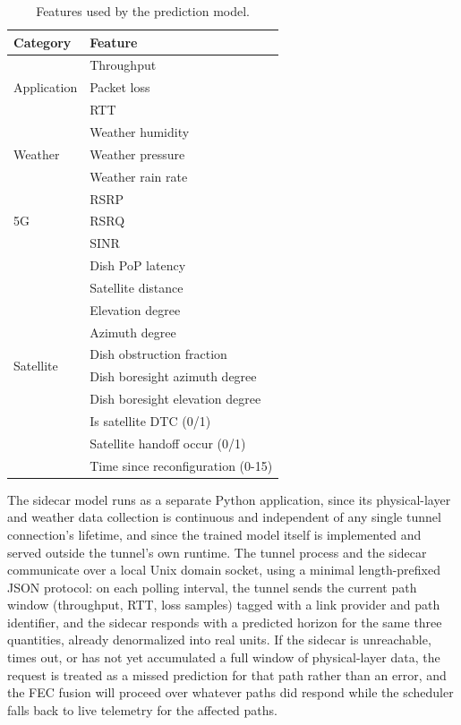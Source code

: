 \documentclass[sigconf,nonacm]{acmart}
\begin{document}
\begin{table}[!htbp]
    \centering
    \caption{Features used by the prediction model.}
    \label{tab:model_features}
    \begin{tabular}{|l||l|}
        \hline
        \textbf{Category} & \textbf{Feature} \\
        \hline
        \hline
        \multirow{3}{*}{Application}
            & Throughput \\
            & Packet loss \\
            & RTT \\
        \hline
        \multirow{3}{*}{Weather}
            & Weather humidity \\
            & Weather pressure \\
            & Weather rain rate \\
        \hline
        \multirow{3}{*}{5G}
            & RSRP \\
            & RSRQ \\
            & SINR \\
        \hline
        \multirow{10}{*}{Satellite}
            & Dish PoP latency \\
            & Satellite distance \\
            & Elevation degree \\
            & Azimuth degree \\
            & Dish obstruction fraction \\
            & Dish boresight azimuth degree \\
            & Dish boresight elevation degree \\
            & Is satellite DTC (0/1) \\
            & Satellite handoff occur (0/1) \\
            & Time since reconfiguration (0-15) \\
        \hline
    \end{tabular}
\end{table}

The sidecar model runs as a separate Python application, since its physical-layer and weather data collection is continuous and independent of any single tunnel connection's lifetime, and since the trained model itself is implemented and served outside the tunnel's own runtime. The tunnel process and the sidecar communicate over a local Unix domain socket, using a minimal length-prefixed JSON protocol: on each polling interval, the tunnel sends the current path window (throughput, RTT, loss samples) tagged with a link provider and path identifier, and the sidecar responds with a predicted horizon for the same three quantities, already denormalized into real units. If the sidecar is unreachable, times out, or has not yet accumulated a full window of physical-layer data, the request is treated as a missed prediction for that path rather than an error, and the FEC fusion will proceed over whatever paths did respond while the scheduler falls back to live telemetry for the affected paths.
\end{document}
